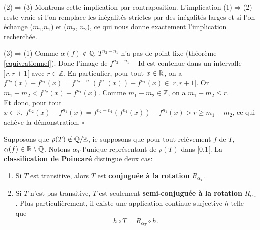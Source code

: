 	\par(2)$\Rightarrow$(3) Montrons cette implication par contraposition. L'implication (1)$\Rightarrow$(2) reste vraie si l'on remplace les inégalités strictes par des inégalités larges et si l'on échange ($m_1$,$n_1$) et ($m_2$, $n_2$), ce qui nous donne exactement l'implication recherchée.\\


	\par (3)$\Rightarrow$(1) Comme $\alpha(f) \notin \mathbb{Q}$, $T^{n_2 - n_1}$ n'a pas de point fixe (théorème \ref{equivrationnel}). Donc l'image de $f^{n_2 - n_1} - \mathrm{Id}$ est contenue dans un intervalle $]r,r+1[$ avec $r \in \mathbb{Z}$. En particulier, pour tout $x \in {\mathbb{R}}$, on a $f^{n_2}(x) - f^{n_1}(x)=f^{n_2-n_1}(f^{n_1}(x))- f^{n_1}(x) \in ]r,r+1[$. Or $m_1 - m_2 < f^{n_2}(x)-f^{n_1}(x)$. Comme $m_1 - m_2 \in \mathbb{Z}$, on a $m_1 - m_2 \leq r$.\\
	Et donc, pour tout $x \in \mathbb{R}, \ f^{n_2}(x) - f^{n_1}(x) = f^{n_2-n_1}(f^{n_1}(x))- f^{n_1}(x)>r \geq m_1 - m_2$, ce qui achève la démonstration. \hfill $\square$\\










\begin{theorem}\label{poincaré}
	Supposons que $\rho(T) \notin \mathbb{Q}/\mathbb{Z}$, ie supposons que pour tout relèvement $ f$ de $T$, $\alpha(f) \in {\mathbb{R}}\setminus {\mathbb{Q}}$. Notons $\alpha_T$ l'unique représentant de $\rho(T)$ dans [0,1[. La \textbf{classification de Poincaré} distingue deux cas:
	\begin{enumerate}
		\item Si $T$ est transitive, alors $T$ est \textbf{conjuguée à la rotation} $R_{\alpha_T}$.
		\item Si $T$ n'est pas transitive, $T$ est seulement \textbf{semi-conjuguée à la rotation} $R_{\alpha_T}$. Plus particulièrement, il existe une application continue surjective $h$ telle que $$h\circ T = R_{\alpha_T} \circ h.$$
	\end{enumerate}
\end{theorem}

